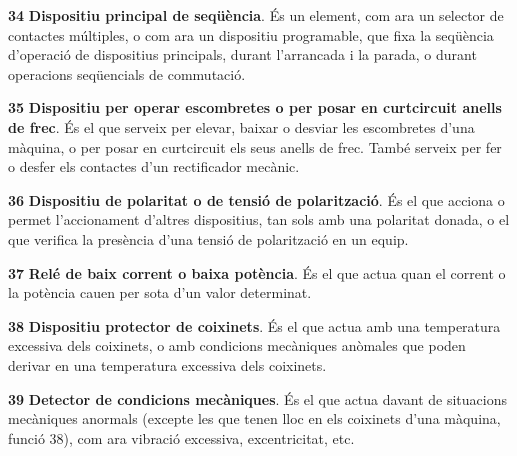 \begin{multicols}{2}
\begin{list}{}
\item[\textbf{34}]  
\textbf{Dispositiu principal de
 seq\"{u}\`{e}ncia}. \'{E}s un element, com ara un selector de contactes m\'{u}ltiples, o com ara un
 dispositiu programable,
 que fixa la seq\"{u}\`{e}ncia d'operaci\'{o}
de dispositius principals, durant l'arrancada i la parada, o durant  operacions seq\"{u}encials de commutaci\'{o}.


\item[\textbf{35}]   
\textbf{Dispositiu per operar escombretes o per posar en curtcircuit anells de frec}. \'{E}s el que serveix per elevar, baixar o
desviar les escombretes d'una m\`{a}quina, o per posar en curtcircuit
els seus anells de frec. Tamb\'{e} serveix per fer o desfer els
contactes d'un rectificador mec\`{a}nic.

\item[\textbf{36}] 
 
\textbf{Dispositiu de
polaritat o de tensi\'{o} de polaritzaci\'{o}}. \'{E}s el que acciona o permet
l'accionament d'altres dispositius, tan sols amb una polaritat
donada, o el que verifica la pres\`{e}ncia d'una tensi\'{o} de polaritzaci\'{o}
en un equip.

\item[\textbf{37}] 
 \textbf{Rel\'{e} de baix corrent o baixa pot\`{e}ncia}. \'{E}s el que actua quan el corrent o la pot\`{e}ncia cauen per
sota d'un valor determinat.

\item[\textbf{38}] 
\textbf{Dispositiu protector de coixinets}. \'{E}s el que actua amb una
temperatura excessiva dels coixinets, o amb condicions mec\`{a}niques
an\`{o}males que poden derivar en una temperatura excessiva dels
coixinets.

\item[\textbf{39}]  
\textbf{Detector de condicions mec\`{a}niques}. \'{E}s el que actua davant
de situacions mec\`{a}niques anormals (excepte les que tenen lloc en els
coixinets d'una m\`{a}quina, funci\'{o} 38), com ara vibraci\'{o} excessiva,
excentricitat, etc.


\end{list}
\end{multicols}
